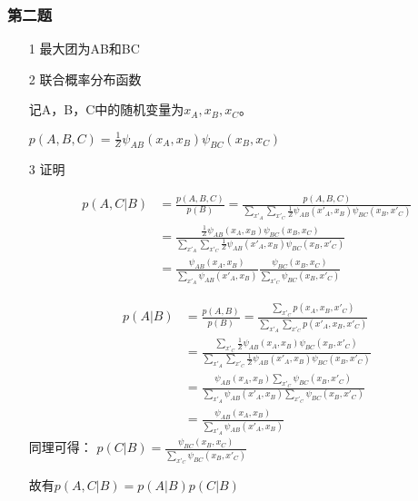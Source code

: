 \documentclass{article}
\begin{document}
\subsubsection*{第二题}
\begin{itemize}
\item[1] 最大团为AB和BC
\item[2] 联合概率分布函数

记A，B，C中的随机变量为$x_A, x_B, x_C$。

$p(A, B, C) = \frac{1}{Z}\psi_{AB}(x_A, x_B)\psi_{BC}(x_B, x_C)$
\item[3] 证明

\begin{equation*}
\begin{split}
p(A,C|B) &= \frac{p(A, B, C)}{p(B)} = \frac{p(A, B, C)}{\sum_{x'_{A}}\sum_{x'_{C}}\frac{1}{Z}\psi_{AB}(x'_{A}, x_B)\psi_{BC}(x_B, x'_{C})}\\
&=\frac{\frac{1}{Z}\psi_{AB}(x_A, x_B)\psi_{BC}(x_B, x_C)}{\sum_{x'_{A}}\sum_{x'_{C}}\frac{1}{Z}\psi_{AB}(x'_{A}, x_B)\psi_{BC}(x_B, x'_{C})}\\
&=\frac{\psi_{AB}(x_A, x_B)}{\sum_{x'_{A}}\psi_{AB}(x'_{A}, x_B)}\frac{\psi_{BC}(x_B, x_C)}{\sum_{x'_{C}}\psi_{BC}(x_B, x'_{C}) }
\end{split}
\end{equation*}

\begin{equation*}
\begin{split}
p(A|B)&=\frac{p(A,B)}{p(B)}=\frac{\sum_{x'_C}p(x_A, x_B, x'_C)}{\sum_{x'_A}\sum_{x'_C}p(x'_A, x_B,x'_C)}\\
&=\frac{\sum_{x'_C}\frac{1}{Z}\psi_{AB}(x_A, x_B)\psi_{BC}(x_B, x'_C)}{\sum_{x'_A}\sum_{x'_C}\frac{1}{Z}\psi_{AB}(x'_A, x_B)\psi_{BC}(x_B, x'_C)}\\
&=\frac{\psi_{AB}(x_A, x_B)\sum_{x'_C}\psi_{BC}(x_B, x'_C)}{\sum_{x'_A}\psi_{AB}(x'_A, x_B)\sum_{x'_C}\psi_{BC}(x_B, x'_C)}\\
&=\frac{\psi_{AB}(x_A, x_B)}{\sum_{x'_A}\psi_{AB}(x'_A, x_B)}
\end{split}	
\end{equation*}
同理可得：
$p(C|B)=\frac{\psi_{BC}(x_B, x_C)}{\sum_{x'_C}\psi_{BC}(x_B, x'_C)}$

故有$p(A,C|B)=p(A|B)p(C|B)$
\end{itemize}
\end{document}
